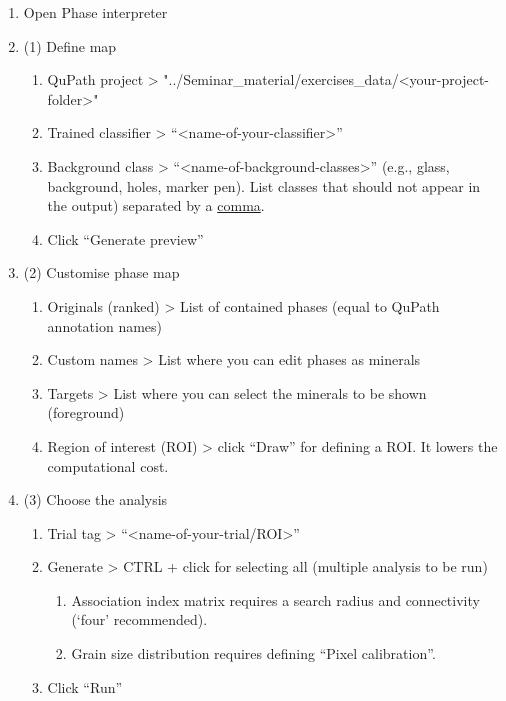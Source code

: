 	\begin{enumerate}
		\def\labelenumi{\arabic{enumi}.}
		\item
		Open Phase interpreter
		\item
		(1) Define map
		
		\begin{enumerate}
			\def\labelenumii{\alph{enumii}.}
			\item
			QuPath project \textgreater{} "../Seminar\_material/exercises\_data/\textless your-project-folder\textgreater"
			\item
			Trained classifier \textgreater{} ``\textless name-of-your-classifier\textgreater''
			\item
			Background class \textgreater{} ``\textless name-of-background-classes\textgreater'' (e.g., glass, background, holes, marker pen). List classes that should not appear in the output) separated by a \ul{comma}.
			\item
			Click ``Generate preview''
		\end{enumerate}
		\item
		(2) Customise phase map
		
		\begin{enumerate}
			\def\labelenumii{\alph{enumii}.}
			\item
			Originals (ranked) \textgreater{} List of contained phases (equal to QuPath annotation names)
			\item
			Custom names \textgreater{} List where you can edit phases as minerals
			\item
			Targets \textgreater{} List where you can select the minerals to be shown (foreground)
			\item
			Region of interest (ROI) \textgreater{} click ``Draw'' for defining a ROI. It lowers the computational cost.
		\end{enumerate}
		\item
		(3) Choose the analysis
		
		\begin{enumerate}
			\def\labelenumii{\alph{enumii}.}
			\item
			Trial tag \textgreater{} ``\textless name-of-your-trial/ROI\textgreater''
			\item
			Generate \textgreater{} CTRL + click for selecting all (multiple analysis to be run)
			
			\begin{enumerate}
				\def\labelenumiii{\roman{enumiii}.}
				\item
				Association index matrix requires a search radius and connectivity (`four' recommended).
				\item
				Grain size distribution requires defining ``Pixel calibration''.
			\end{enumerate}
			\item
			Click ``Run''
		\end{enumerate}
	\end{enumerate}
	

